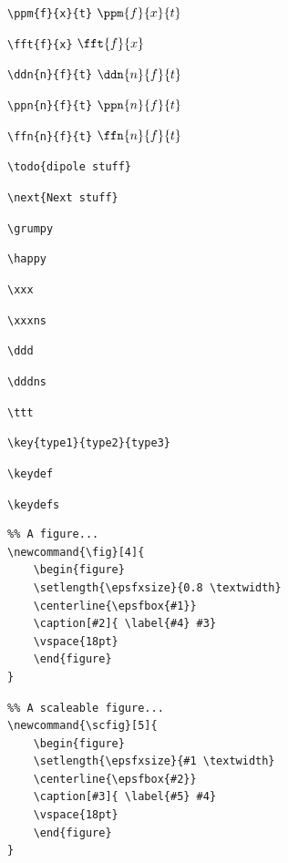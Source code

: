 \verb*+\ppm{f}{x}{t}+ $\ppm{f}{x}{t}$


\verb*+\fft{f}{x}+ $\fft{f}{x}$


\verb*+\ddn{n}{f}{t}+ $\ddn{n}{f}{t}$


\verb*+\ppn{n}{f}{t}+ $\ppn{n}{f}{t}$



\verb*+\ffn{n}{f}{t}+ $\ffn{n}{f}{t}$





\verb*+\todo{dipole stuff}+ 


\verb*+\next{Next stuff}+ 



\verb*+\grumpy+ \grumpy

\verb*+\happy+ \happy



\verb*+\xxx+ \xxx



\verb*+\xxxns+ \xxxns



\verb*+\ddd+ \ddd



\verb*+\dddns+ \dddns



\verb*+\ttt+ \ttt



\verb*+\key{type1}{type2}{type3}+ 


\verb*+\keydef+ \keydef


\verb*+\keydefs+ \keydefs


\begin{verbatim}
%% A figure...
\newcommand{\fig}[4]{
	\begin{figure}
	\setlength{\epsfxsize}{0.8 \textwidth}
	\centerline{\epsfbox{#1}}
	\caption[#2]{ \label{#4} #3}
	\vspace{18pt}
	\end{figure}
}
\end{verbatim}

\begin{verbatim}
%% A scaleable figure...
\newcommand{\scfig}[5]{
	\begin{figure}
	\setlength{\epsfxsize}{#1 \textwidth}
	\centerline{\epsfbox{#2}}
	\caption[#3]{ \label{#5} #4}
	\vspace{18pt}
	\end{figure}
}
\end{verbatim}

